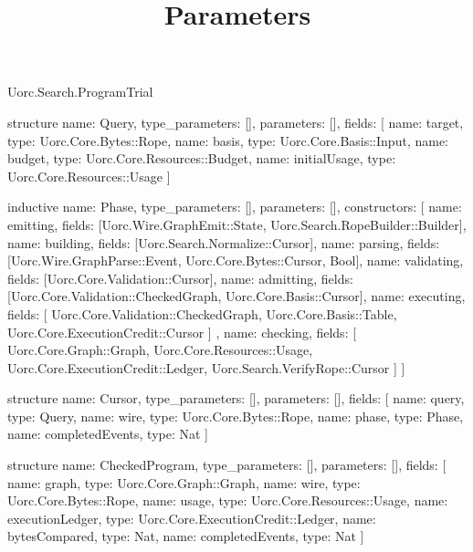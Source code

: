 \begin{lexlean}{Uorc.Search.ProgramTrial}
\title{Parameters}
\begin{semanticmodule}
structure{
  name: Query,
  type_parameters: [],
  parameters: [],
  fields: [
    {name: target, type: Uorc.Core.Bytes::Rope},
    {name: basis, type: Uorc.Core.Basis::Input},
    {name: budget, type: Uorc.Core.Resources::Budget},
    {name: initialUsage, type: Uorc.Core.Resources::Usage}
  ]
}

inductive{
  name: Phase,
  type_parameters: [],
  parameters: [],
  constructors: [
    {name: emitting, fields: [Uorc.Wire.GraphEmit::State, Uorc.Search.RopeBuilder::Builder]},
    {name: building, fields: [Uorc.Search.Normalize::Cursor]},
    {name: parsing, fields: [Uorc.Wire.GraphParse::Event, Uorc.Core.Bytes::Cursor, Bool]},
    {name: validating, fields: [Uorc.Core.Validation::Cursor]},
    {name: admitting, fields: [Uorc.Core.Validation::CheckedGraph, Uorc.Core.Basis::Cursor]},
    {
      name: executing,
      fields: [
        Uorc.Core.Validation::CheckedGraph,
        Uorc.Core.Basis::Table,
        Uorc.Core.ExecutionCredit::Cursor
      ]
    },
    {
      name: checking,
      fields: [
        Uorc.Core.Graph::Graph,
        Uorc.Core.Resources::Usage,
        Uorc.Core.ExecutionCredit::Ledger,
        Uorc.Search.VerifyRope::Cursor
      ]
    }
  ]
}

structure{
  name: Cursor,
  type_parameters: [],
  parameters: [],
  fields: [
    {name: query, type: Query},
    {name: wire, type: Uorc.Core.Bytes::Rope},
    {name: phase, type: Phase},
    {name: completedEvents, type: Nat}
  ]
}

structure{
  name: CheckedProgram,
  type_parameters: [],
  parameters: [],
  fields: [
    {name: graph, type: Uorc.Core.Graph::Graph},
    {name: wire, type: Uorc.Core.Bytes::Rope},
    {name: usage, type: Uorc.Core.Resources::Usage},
    {name: executionLedger, type: Uorc.Core.ExecutionCredit::Ledger},
    {name: bytesCompared, type: Nat},
    {name: completedEvents, type: Nat}
  ]
}


\end{semanticmodule}
\end{lexlean}
